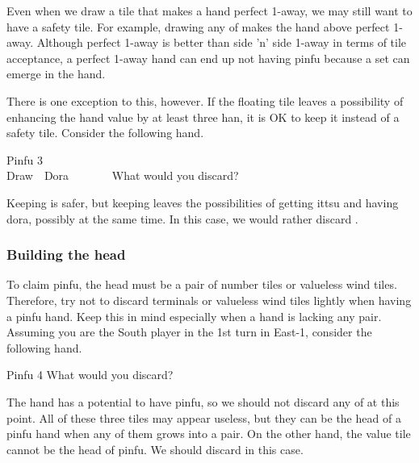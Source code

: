 \bigskip
Even when we draw a tile that makes a hand perfect 1-away, we may still want to have a safety tile. For example, drawing any of {\LARGE{}} makes the hand above perfect 1-away. 
Although perfect 1-away is better than side 'n' side 1-away in terms of tile acceptance, a perfect 1-away hand can end up not having {\jap pinfu} because a set can emerge in the hand. 

\vfill
There is one exception to this, however. If the floating tile leaves a possibility of enhancing the hand value by at least three {\jap han}, it is OK to keep it instead of a safety tile. Consider the following hand. 
\begin{itembox}[r]{{\jap Pinfu} 3}
\bp
{}~\xi~\\
\hfill\footnotesize{Draw~~{\jap Dora}~~~~~~~}
\ep
\vspace{-17pt}What would you discard? \vspace{-5pt}
\end{itembox}

\bigskip
\noindent Keeping {\LARGE\xi} is safer, but keeping {\LARGE{}} leaves the possibilities of getting {\jap ittsu} and having {\jap dora}, possibly at the same time. In this case, we would rather discard {\LARGE\xi}. 

\newpage

\subsubsection{Building the head}
To claim {\jap pinfu}, the head must be a pair of number tiles or valueless wind tiles. Therefore, try not to discard terminals or valueless wind tiles lightly when having a {\jap pinfu} hand. Keep this in mind especially when a hand is lacking any pair. Assuming you are the South player in the 1st turn in East-1, consider the following hand. 
\begin{itembox}[r]{{\jap Pinfu} 4}
\bp
{}\xi\fa
\ep
\vspace{-10pt}What would you discard? \vspace{-5pt}
\end{itembox}

\bigskip
\noindent The hand has a potential to have {\jap pinfu}, so we should not discard any of {\LARGE{}\xi} at this point. All of these three tiles may appear useless, but they can be the head of a {\jap pinfu} hand when any of them grows into a pair. On the other hand, the value tile {\LARGE\fa} cannot be the head of {\jap pinfu}. We should discard {\LARGE\fa} in this case. 

